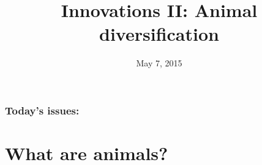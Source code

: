 





\title[Innovations II: Animal diversification]{Innovations II: Animal
    diversification}
\date{May 7, 2015}





\begin{noheadline}
\maketitle
\end{noheadline}


\begin{noheadline}
\begin{frame}
\frametitle{Today's issues:}
\vspace{5mm}
\tableofcontents
\end{frame}
\end{noheadline}

\section[What are animals?]{What are animals?}

